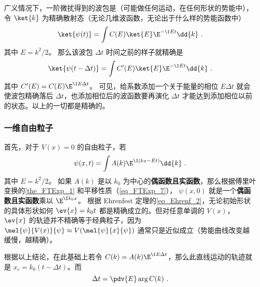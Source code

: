 
\begin{issues}
\issueDraft
\end{issues}

广义情况下，一阶微扰得到的波包是（可能做任何运动，在任何形状的势能中）， 令 $\ket{k}$ 为精确散射态（无论几维波函数，无论出于什么样的势能函数中）
\begin{equation}
\ket{\psi(t)} = \int C(E)\ket{E}\E^{-\I Et}\dd{k}~.
\end{equation}
其中 $E = k^2/2$。 那么该波包 $\Delta t$ 时间之前的样子就精确是
\begin{equation}
\ket{\psi(t-\Delta t)} = \int C'(E)\ket{E}\E^{-\I Et}\dd{k}~.
\end{equation}
其中 $C'(E) = C(E)\E^{\I E \Delta t}$。 可见，给系数添加一个关于能量的相位 $E \Delta t$ 就会使波包精确落后 $\Delta t$，也添加相位后的波函数要再演化 $\Delta t$ 才能达到添加相位以前的状态。以上的一切都是精确的。

\subsubsection{一维自由粒子}
首先，对于 $V(x)=0$ 的自由粒子，若
\begin{equation}
\psi(x,t) = \int A(k)\E^{\I (kx-Et)} \dd{k}~.
\end{equation}
其中 $E=k^2/2$。 如果 $A(k)$ 是以 $k_0$ 为中心的\textbf{偶函数且实函数}，那么根据傅里叶变换的\autoref{the_FTExp_1}  和平移性质（\autoref{eq_FTExp_7}）， $\psi(x,0)$ 就是一个\textbf{偶函数且实函数}乘以 $\E^{\I k_0 x}$。 根据 Ehrenfest 定理的\autoref{eq_Ehrenf_2}，无论初始形状的具体形状如何 $\ev{x} = k_0 t$ 都是精确成立的。但对任意单调的 $V(x)$， $\ev{x}$ 的轨迹并不精确等于经典粒子，因为 $\mel{\psi}{V(x)}{\psi} \approx V(\mel{\psi}{x}{\psi})$ 通常只是近似成立（势能曲线改变越缓慢，越精确）。

根据以上结论，在此基础上若令 $C(k) = A(k)\E^{\I E\Delta t}$，那么此直线运动的轨迹就是 $x_c = k_0(t-\Delta t)$。而
\begin{equation}\label{eq_tDelay_2}
\Delta t = \pdv{E} \arg C(k)~.
\end{equation}

